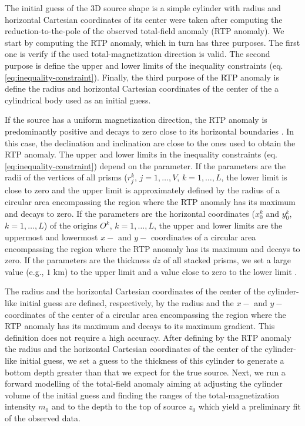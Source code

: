 The initial guess of the 3D source shape is a simple cylinder with radius and horizontal Cartesian coordinates of its center were taken after computing the reduction-to-the-pole of the observed total-field anomaly (RTP anomaly).
We start by computing the RTP anomaly, which in turn has three purposes.
The first one is verify if the used total-magnetization direction is valid.
The second purpose is define the upper and lower limits of the inequality constraints 
(eq. \ref{eq:inequality-constraint}).
Finally, the third purpose of the RTP anomaly is define the radius and horizontal Cartesian coordinates of the center of the a cylindrical body used as an initial guess.

If the source has a uniform magnetization direction, the RTP anomaly is predominantly positive and decays to zero close to its horizontal boundaries \cite{reis-etal2020}. 
In this case, the declination and inclination are close to the ones used to obtain the RTP anomaly.
The upper and lower limits in the inequality constraints (eq. \ref{eq:inequality-constraint}) depend on the parameter. 
If the parameters are the radii of the vertices of all prisms 
($r^{k}_{j}$, $j=1,\dots , V$, $k=1,\dots ,L$, the lower limit is close to zero and the upper limit is approximately defined by the radius of a circular area encompassing the region where the RTP anomaly has its maximum and decays to zero.
If the parameters are the horizontal coordinates ($x_{0}^{k}$ and $y_{0}^{k}$, $k=1,\dots ,L$) of the origins $O^{k}$, $k=1,\dots ,L$, the upper and lower limits are 
the uppermost and lowermost $x-$ and $y-$ coordinates of a circular area encompassing the region where the RTP anomaly has its maximum and decays to zero.
If the parameters are the thickness $dz$ of all stacked prisms, we set a large value 
(e.g., $1$ km) to the upper limit and a value close to zero to the lower limit .

The radius and the horizontal Cartesian coordinates of the center of the cylinder-like initial guess are defined, respectively, by the radius and the $x-$ and $y-$ coordinates of the center of a circular area encompassing the region where the RTP anomaly has  
its maximum and decays to its maximum gradient. 
This definition does not require a high accuracy. 
After defining by the RTP anomaly the radius and the horizontal Cartesian coordinates of the center of the cylinder-like initial guess, we set a guess to the thickness 
of this cylinder to generate a bottom depth greater than that we expect for the true source. 
Next, we run a forward modelling of the total-field anomaly aiming at adjusting the cylinder volume of the initial guess and finding the ranges of the total-magnetization intensity $m_{0}$ and to the depth to the top of source $z_{0}$ which yield a preliminary fit of the observed data.

